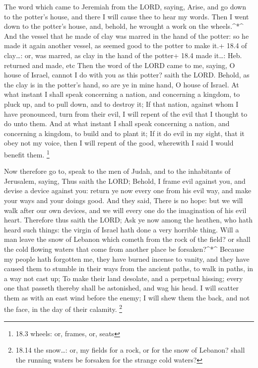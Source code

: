 The word which came to Jeremiah from the LORD, saying,
 Arise, and go down to the potter's house, and there I will
cause thee to hear my words.  Then I went down to the
potter's house, and, behold, he wrought a work on the wheels.\^{}*\^{}
 And the vessel that he made of clay was marred in the hand
of the potter: so he made it again another vessel, as seemed good to the
potter to make it.+ 18.4 of clay\ldots: or, was marred, as clay in the
hand of the potter+ 18.4 made it\ldots: Heb. returned and made, etc
 Then the word of the LORD came to me, saying, 
O house of Israel, cannot I do with you as this potter? saith the LORD.
Behold, as the clay is in the potter's hand, so are ye in mine hand, O
house of Israel.  At what instant I shall speak concerning a
nation, and concerning a kingdom, to pluck up, and to pull down, and to
destroy it;  If that nation, against whom I have pronounced,
turn from their evil, I will repent of the evil that I thought to do
unto them.  And at what instant I shall speak concerning a
nation, and concerning a kingdom, to build and to plant it;
 If it do evil in my sight, that it obey not my voice, then
I will repent of the good, wherewith I said I would benefit them.
\footnote{18.3 wheels: or, frames, or, seats}

 Now therefore go to, speak to the men of Judah, and to the
inhabitants of Jerusalem, saying, Thus saith the LORD; Behold, I frame
evil against you, and devise a device against you: return ye now every
one from his evil way, and make your ways and your doings good.
 And they said, There is no hope: but we will walk after
our own devices, and we will every one do the imagination of his evil
heart.  Therefore thus saith the LORD; Ask ye now among the
heathen, who hath heard such things: the virgin of Israel hath done a
very horrible thing.  Will a man leave the snow of Lebanon
which cometh from the rock of the field? or shall the cold flowing
waters that come from another place be forsaken?\^{}*\^{} 
Because my people hath forgotten me, they have burned incense to vanity,
and they have caused them to stumble in their ways from the ancient
paths, to walk in paths, in a way not cast up;  To make
their land desolate, and a perpetual hissing; every one that passeth
thereby shall be astonished, and wag his head.  I will
scatter them as with an east wind before the enemy; I will shew them the
back, and not the face, in the day of their calamity. \footnote{18.14
  the snow\ldots: or, my fields for a rock, or for the snow of Lebanon?
  shall the running waters be forsaken for the strange cold waters?}

